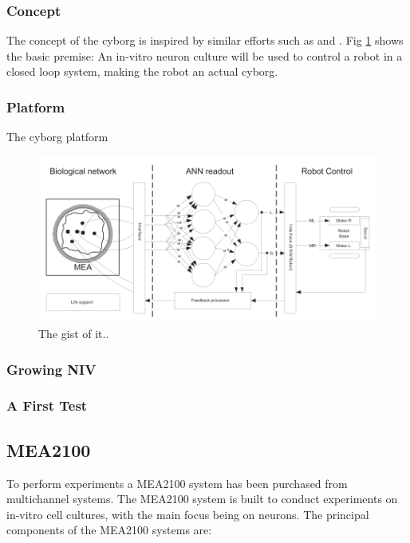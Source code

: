 \subsubsection{Concept}
The concept of the cyborg is inspired by similar efforts such as
\cite{li_application_2015} and \cite{warwick paper}.
Fig \ref{fig:cyborg_idea} shows the basic premise: An in-vitro neuron culture will be used to
control a robot in a closed loop system, making the robot an actual cyborg.
\subsubsection{Platform}
The cyborg platform 
\begin{figure}[h!]
    \includegraphics[width=\linewidth]{images/cyborg_overview.png}
    \caption{The gist of it..}
    \label{fig:cyborg_idea}
\end{figure}
\subsubsection{Growing NIV}
\subsubsection{A First Test}


\subsection{MEA2100}
To perform experiments a MEA2100 system has been purchased from multichannel systems.
The MEA2100 system is built to conduct experiments on in-vitro cell cultures, 
with the main focus being on neurons.
The principal components of the MEA2100 systems are:
